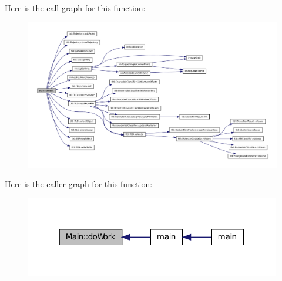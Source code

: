 Here is the call graph for this function:
\nopagebreak
\begin{figure}[H]
\begin{center}
\leavevmode
\includegraphics[width=400pt]{class_main_a5effa58c6ae671f8ce4ff31cb6e07aa5_cgraph}
\end{center}
\end{figure}




Here is the caller graph for this function:
\nopagebreak
\begin{figure}[H]
\begin{center}
\leavevmode
\includegraphics[width=316pt]{class_main_a5effa58c6ae671f8ce4ff31cb6e07aa5_icgraph}
\end{center}
\end{figure}




